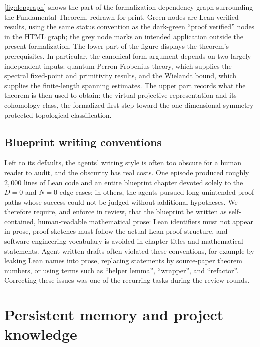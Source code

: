 \cref{fig:depgraph} shows the part of the formalization dependency graph surrounding the Fundamental Theorem, redrawn for print. Green nodes are Lean-verified results, using the same status convention as the dark-green ``proof verified'' nodes in the HTML graph; the grey node marks an intended application outside the present formalization. The lower part of the figure displays the theorem's prerequisites. In particular, the canonical-form argument depends on two largely independent inputs: quantum Perron-Frobenius theory, which supplies the spectral fixed-point and primitivity results, and the Wielandt bound, which supplies the finite-length spanning estimates. The upper part records what the theorem is then used to obtain: the virtual projective representation and its cohomology class, the formalized first step toward the one-dimensional symmetry-protected topological classification.




\subsection{Blueprint writing conventions}\label{sec:bp_sync}



Left to its defaults, the agents' writing style is often too obscure for a human reader to audit, and the obscurity has real costs. One episode produced roughly $2{,}000$ lines of Lean code and an entire blueprint chapter devoted solely to the $D=0$ and $N=0$ edge cases; in others, the agents pursued long unintended proof paths whose success could not be judged without additional hypotheses.
We therefore require, and enforce in review, that the blueprint be written as self-contained, human-readable mathematical prose: Lean identifiers must not appear in prose, proof sketches must follow the actual Lean proof structure, and software-engineering vocabulary is avoided in chapter titles and mathematical statements.
Agent-written drafts often violated these conventions, for example by leaking Lean names into prose, replacing statements by source-paper theorem numbers, or using terms such as ``helper lemma'', ``wrapper'',
and ``refactor''. Correcting these issues was one of the recurring tasks during
the \nReviewRounds{} review rounds.



\section{Persistent memory and project knowledge}\label{app:memory}


